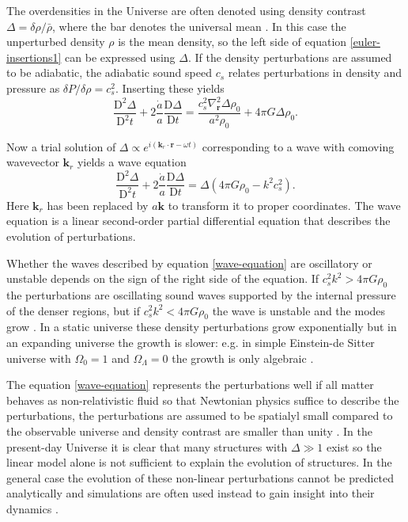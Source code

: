 \documentclass[english, oneside]{HYgradu}
\begin{document}
The overdensities in the Universe are often denoted using density contrast $\Delta = \delta\rho/\bar{\rho}$, where the bar denotes the universal mean \citep{mo2010galaxy}. In this case the unperturbed density $\rho$ is the mean density, so the left side of equation \ref{euler-insertions1} can be expressed using $\Delta$. If the density perturbations are assumed to be adiabatic, the adiabatic sound speed $c_s$ relates perturbations in density and pressure as $\delta P / \delta \rho = c_s^2$. Inserting these yields
\begin{equation}\label{euler-insertions1}
\frac{\textrm{D}^2\Delta}{\textrm{D}^2 t} + 2 \frac{\dot a}{a} \frac{\textrm{D}\Delta}{\textrm{D} t} = \frac{c_s^2 \nabla_\mathbf{r}^2 \Delta \rho_0}{a^2 \rho_0} + 4 \pi G \Delta \rho_0.
\end{equation}

Now a trial solution of $\Delta \propto e^{i(\mathbf{k}_r\cdot\mathbf{r}-\omega t)}$ corresponding to a wave with comoving wavevector $\mathbf{k}_r$ yields a wave equation
\begin{equation}\label{wave-equation}
\frac{\textrm{D}^2\Delta}{\textrm{D}^2 t} + 2 \frac{\dot a}{a} \frac{\textrm{D}\Delta}{\textrm{D} t} = \Delta(4\pi G \rho_0 - k^2c_s^2).
\end{equation}
Here $\mathbf{k}_r$ has been replaced by $a\mathbf{k}$ to transform it to proper coordinates. The wave equation is a linear second-order partial differential equation that describes the evolution of perturbations.

Whether the waves described by equation \ref{wave-equation} are oscillatory or unstable depends on the sign of the right side of the equation. If $c_s^2k^2 > 4\pi G\rho_0$ the perturbations are oscillating sound waves  supported by the internal pressure of the denser regions, but if $c_s^2k^2 < 4\pi G\rho_0$ the wave is unstable and the modes grow \citep{longair2008galaxy}. In a static universe these density perturbations grow exponentially but in an expanding universe the growth is slower: e.g. in simple Einstein-de Sitter universe with $\Omega_0 = 1$ and $\Omega_\Lambda = 0$ the growth is only algebraic \citep{longair2008galaxy}.

The equation \ref{wave-equation} represents the perturbations well if all matter behaves as non-relativistic fluid so that Newtonian physics suffice to describe the perturbations, the perturbations are assumed to be spatialyl small compared to the observable universe and density contrast are smaller than unity \citep{mo2010galaxy}. In the present-day Universe it is clear that many structures with $\Delta \gg 1$ exist so the linear model alone is not sufficient to explain the evolution of structures. In the general case the evolution of these non-linear perturbations cannot be predicted analytically and simulations are often used instead to gain insight into their dynamics \citep{mo2010galaxy}.
\end{document}
